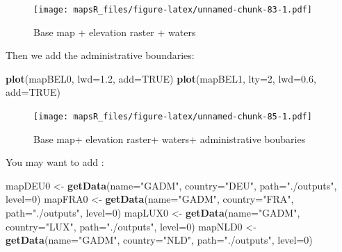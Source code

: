 \documentclass[]{report}
\newenvironment{Shaded}{\begin{snugshade}}{\end{snugshade}}
\newcommand{\DataTypeTok}[1]{\textcolor[rgb]{0.13,0.29,0.53}{#1}}
\newcommand{\DecValTok}[1]{\textcolor[rgb]{0.00,0.00,0.81}{#1}}
\newcommand{\FloatTok}[1]{\textcolor[rgb]{0.00,0.00,0.81}{#1}}
\newcommand{\KeywordTok}[1]{\textcolor[rgb]{0.13,0.29,0.53}{\textbf{#1}}}
\newcommand{\NormalTok}[1]{#1}
\newcommand{\OtherTok}[1]{\textcolor[rgb]{0.56,0.35,0.01}{#1}}
\newcommand{\StringTok}[1]{\textcolor[rgb]{0.31,0.60,0.02}{#1}}
\begin{document}
\begin{figure}
\centering
\texttt{[image: mapsR\_files/figure-latex/unnamed-chunk-83-1.pdf]}
\caption{Base map + elevation raster + waters}
\end{figure}

Then we add the administrative boundaries:

\begin{Shaded}
\begin{Highlighting}[]
\KeywordTok{plot}\NormalTok{(mapBEL0, }\DataTypeTok{lwd=}\FloatTok{1.2}\NormalTok{, }\DataTypeTok{add=}\OtherTok{TRUE}\NormalTok{)}
\KeywordTok{plot}\NormalTok{(mapBEL1, }\DataTypeTok{lty=}\DecValTok{2}\NormalTok{, }\DataTypeTok{lwd=}\FloatTok{0.6}\NormalTok{, }\DataTypeTok{add=}\OtherTok{TRUE}\NormalTok{)}
\end{Highlighting}
\end{Shaded}

\begin{figure}
\centering
\texttt{[image: mapsR\_files/figure-latex/unnamed-chunk-85-1.pdf]}
\caption{Base map+ elevation raster+ waters+ administrative boubaries}
\end{figure}

You may want to add :

\begin{Shaded}
\begin{Highlighting}[]
\NormalTok{mapDEU0 <-}\StringTok{ }\KeywordTok{getData}\NormalTok{(}\DataTypeTok{name=}\StringTok{"GADM"}\NormalTok{, }\DataTypeTok{country=}\StringTok{"DEU"}\NormalTok{, }\DataTypeTok{path=}\StringTok{"./outputs"}\NormalTok{, }\DataTypeTok{level=}\DecValTok{0}\NormalTok{)}
\NormalTok{mapFRA0 <-}\StringTok{ }\KeywordTok{getData}\NormalTok{(}\DataTypeTok{name=}\StringTok{"GADM"}\NormalTok{, }\DataTypeTok{country=}\StringTok{"FRA"}\NormalTok{, }\DataTypeTok{path=}\StringTok{"./outputs"}\NormalTok{, }\DataTypeTok{level=}\DecValTok{0}\NormalTok{)}
\NormalTok{mapLUX0 <-}\StringTok{ }\KeywordTok{getData}\NormalTok{(}\DataTypeTok{name=}\StringTok{"GADM"}\NormalTok{, }\DataTypeTok{country=}\StringTok{"LUX"}\NormalTok{, }\DataTypeTok{path=}\StringTok{"./outputs"}\NormalTok{, }\DataTypeTok{level=}\DecValTok{0}\NormalTok{)}
\NormalTok{mapNLD0 <-}\StringTok{ }\KeywordTok{getData}\NormalTok{(}\DataTypeTok{name=}\StringTok{"GADM"}\NormalTok{, }\DataTypeTok{country=}\StringTok{"NLD"}\NormalTok{, }\DataTypeTok{path=}\StringTok{"./outputs"}\NormalTok{, }\DataTypeTok{level=}\DecValTok{0}\NormalTok{)}
\end{Highlighting}
\end{Shaded}
\end{document}
